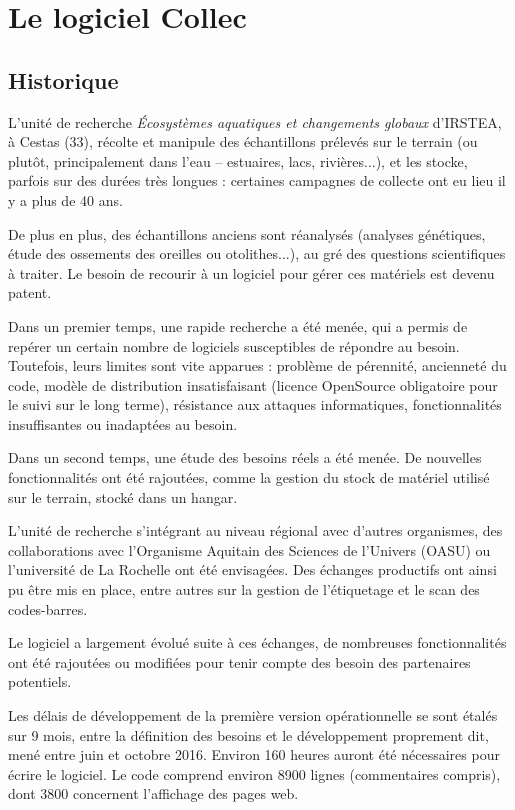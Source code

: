 \chapter{Le logiciel Collec}
\section{Historique}

L'unité de recherche \textit{Écosystèmes aquatiques et changements globaux} d'IRSTEA, à Cestas (33), récolte et manipule des échantillons prélevés sur le terrain (ou plutôt, principalement dans l'eau -- estuaires, lacs, rivières...), et les stocke, parfois sur des durées très longues : certaines campagnes de collecte ont eu lieu il y a plus de 40 ans.

De plus en plus, des échantillons anciens sont réanalysés (analyses génétiques, étude des ossements des oreilles ou otolithes...), au gré des questions scientifiques à traiter. 
Le besoin de recourir à un logiciel pour gérer ces matériels est devenu patent.

Dans un premier temps, une rapide recherche  a été menée, qui a permis de repérer un certain nombre de logiciels susceptibles de répondre au besoin. Toutefois, leurs limites sont vite apparues : problème de pérennité, ancienneté du code, modèle de distribution insatisfaisant (licence OpenSource obligatoire pour le suivi sur le long terme), résistance aux attaques informatiques, fonctionnalités insuffisantes ou inadaptées au besoin.

Dans un second temps, une étude des besoins réels a été menée. De nouvelles fonctionnalités ont été rajoutées, comme la gestion du stock de matériel utilisé sur le terrain, stocké dans un hangar.

L'unité de recherche s'intégrant au niveau régional avec d'autres organismes, des collaborations avec l'Organisme Aquitain des Sciences de l'Univers (OASU) ou l'université de La Rochelle ont été envisagées.
Des échanges productifs ont ainsi pu être mis en place, entre autres sur la gestion de l'étiquetage et le scan des codes-barres.

Le logiciel a largement évolué suite à ces échanges, de nombreuses fonctionnalités ont été rajoutées ou modifiées pour tenir compte des besoin des partenaires potentiels. 

Les délais de développement de la première version opérationnelle se sont étalés sur 9 mois, entre la définition des besoins et le développement proprement dit, mené entre juin et octobre 2016. Environ 160 heures auront été nécessaires pour écrire le logiciel.
Le code comprend environ 8900 lignes (commentaires compris), dont 3800 concernent l'affichage des pages web.


